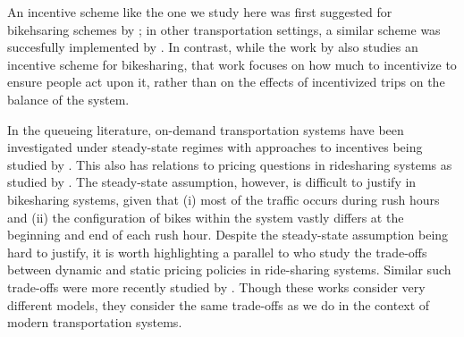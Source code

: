 An incentive scheme like the one we study here was first suggested for bikehsaring schemes by \cite{henomashm16}; in other transportation settings, a similar scheme was succesfully implemented by \cite{merugu2009incentive}. In contrast, while the work by \cite{singla2015incentivizing} also studies an incentive scheme for bikesharing, that work focuses on how much to incentivize to ensure people act upon it, rather than on the effects of incentivized trips on the balance of the system.

In the queueing literature, on-demand transportation systems have been investigated under steady-state regimes with approaches to incentives being studied by \cite{fricker2012incentives,fricker2016incentives}. This also has relations to pricing questions in ridesharing systems as studied by \cite{george2012stochastic,Waserhole2014,banerjee2017pricing}. The steady-state assumption, however, is difficult to justify in bikesharing systems, given that (i) most of the traffic occurs during rush hours and (ii) the configuration of bikes within the system vastly differs at the beginning and end of each rush hour. Despite the steady-state assumption being hard to justify, it is worth highlighting a parallel to \cite{banerjee2015pricing} who study the trade-offs between dynamic and static pricing policies in ride-sharing systems. Similar such trade-offs were more recently studied by \cite{chen2017pricing}. Though these works consider very different models, they consider the same trade-offs as we do in the context of modern transportation systems. %


%
%
%

